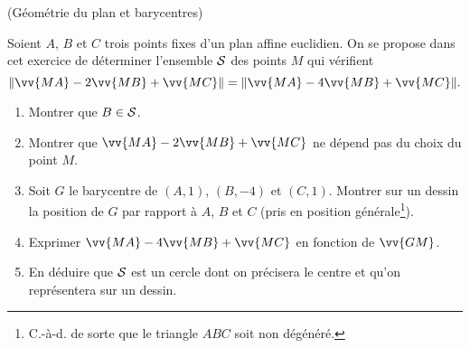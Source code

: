 \documentclass[a4paper,12pt,reqno]{amsart}
\begin{document}
\begin{exo} (Géométrie du plan et barycentres)

  Soient $A$, $B$ et $C$ trois points fixes d'un plan affine euclidien. On se propose dans cet exercice de déterminer l'ensemble $\mathcal{S}$ des points $M$ qui vérifient
  \[
    \| \vv{MA} - 2\vv{MB}+\vv{MC} \| = \| \vv{MA} - 4\vv{MB}+\vv{MC} \|.
  \]
  \begin{enumerate}
    \item Montrer que $B \in \mathcal{S}$.
    \item Montrer que $\vv{MA} - 2\vv{MB}+\vv{MC}$ ne dépend pas du choix du point $M$.
    \item Soit $G$ le barycentre de $(A,1)$, $(B,-4)$ et $(C,1)$. Montrer sur un dessin la position de $G$ par rapport à $A$, $B$ et $C$ (pris en position générale\footnote{C.-à-d. de sorte que le triangle $ABC$ soit non dégénéré.}).
    \item Exprimer $\vv{MA} - 4\vv{MB}+\vv{MC}$ en fonction de $\vv{GM}$.
    \item En déduire que $\mathcal{S}$ est un cercle dont on précisera le centre et qu'on représentera sur un dessin.
   \end{enumerate}

\end{exo}
\end{document}
